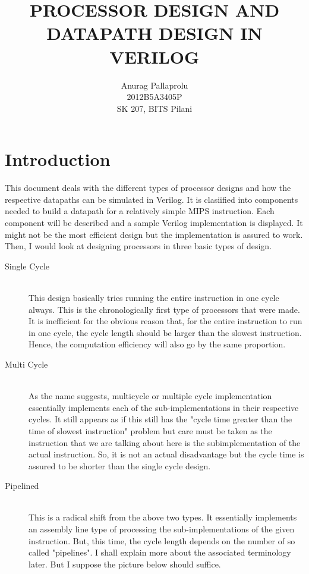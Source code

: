 \documentclass[11pt]{article}
\begin{document}
\title{PROCESSOR DESIGN AND DATAPATH DESIGN IN VERILOG}
\author{Anurag Pallaprolu\\2012B5A3405P\\SK 207, BITS Pilani}
\maketitle
\tableofcontents
\setcounter{tocdepth}{3}
\section{Introduction}
This document deals with the different types of processor designs and how the respective datapaths can be simulated in Verilog. It is clasiified into components needed to build a datapath for a relatively simple MIPS instruction. Each component will be described and a sample Verilog implementation is displayed. It might not be the most efficient design but the implementation is assured to work. Then, I would look at designing processors in three basic types of design.
\begin{description}
	\item[Single Cycle] \hfill \\
	This design basically tries running the entire instruction in one cycle always. This is the chronologically first type of processors that were made. It is inefficient for the obvious reason that, for the entire instruction to run in one cycle, the cycle length should be larger than the slowest instruction. Hence, the computation efficiency will also go by the same proportion.
	\item[Multi Cycle] \hfill \\
	As the name suggests, multicycle or multiple cycle implementation essentially implements each of the sub-implementations in their respective cycles. It still appears as if this still has the "cycle time greater than the time of slowest instruction" problem but care must be taken as the instruction that we are talking about here is the subimplementation of the actual instruction. So, it is not an actual disadvantage but the cycle time is assured to be shorter than the single cycle design.
	\item[Pipelined] \hfill \\
	This is a radical shift from the above two types. It essentially implements an assembly line type of processing the sub-implementations of the given instruction. But, this time, the cycle length depends on the number of so called "pipelines". I shall explain more about the associated terminology later. But I suppose the picture below should suffice.

\end{description}
\end{document}
